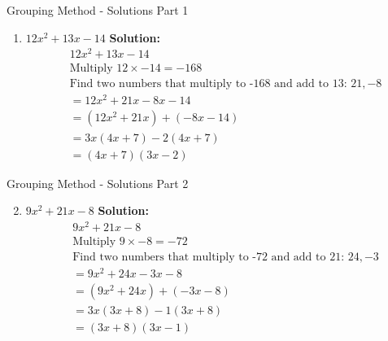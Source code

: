 \documentclass[aspectratio=169]{beamer}
\begin{document}
\begin{frame}{Grouping Method - Solutions Part 1}
    \begin{tcolorbox}[colback=lightgray,colframe=accent,title=Detailed Solutions]
        \footnotesize
        \begin{enumerate}
            \setlength{\itemsep}{0.5em}
            \item $12x^2 + 13x - 14$
            \quad \textbf{Solution:}
            \begin{align*}
                & 12x^2 + 13x - 14 \\
                & \text{Multiply } 12 \times -14 = -168 \\
                & \text{Find two numbers that multiply to -168 and add to 13: } 21, -8 \\
                &= 12x^2 + 21x - 8x - 14 \\
                &= (12x^2 + 21x) + (-8x - 14) \\
                &= 3x(4x + 7) - 2(4x + 7) \\
                &= (4x + 7)(3x - 2)
            \end{align*}
        \end{enumerate}
    \end{tcolorbox}
\end{frame}

\begin{frame}{Grouping Method - Solutions Part 2}
    \begin{tcolorbox}[colback=lightgray,colframe=accent,title=Detailed Solutions]
        \footnotesize
        \begin{enumerate}
            \setcounter{enumi}{1}
            \setlength{\itemsep}{0.5em}
            \item $9x^2 + 21x - 8$
            \quad \textbf{Solution:}
            \begin{align*}
                & 9x^2 + 21x - 8 \\
                & \text{Multiply } 9 \times -8 = -72 \\
                & \text{Find two numbers that multiply to -72 and add to 21: } 24, -3 \\
                &= 9x^2 + 24x - 3x - 8 \\
                &= (9x^2 + 24x) + (-3x - 8) \\
                &= 3x(3x + 8) - 1(3x + 8) \\
                &= (3x + 8)(3x - 1)
            \end{align*}
        \end{enumerate}
    \end{tcolorbox}
\end{frame}
\end{document}
